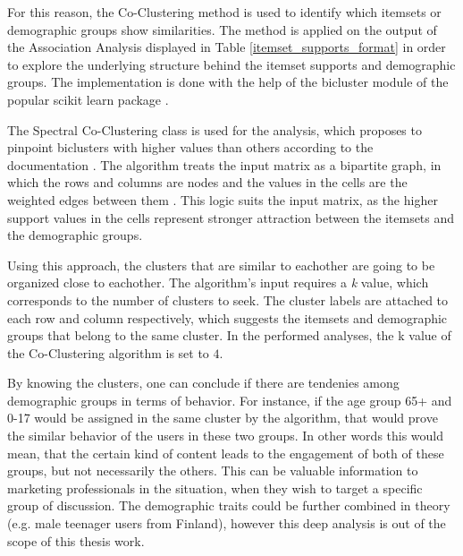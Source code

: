     For this reason, the Co-Clustering method is used to identify which itemsets or demographic groups show similarities. The method is applied on the output of the Association Analysis displayed in Table \ref{itemset_supports_format} in order to explore the underlying structure behind the itemset supports and demographic groups. The implementation is done with the help of the bicluster module \cite{scikit-bicluster} of the popular scikit learn package \cite{scikit-learn}. 
    
    The Spectral Co-Clustering class is used for the analysis, which proposes to pinpoint biclusters with higher values than others according to the documentation \cite{scikit-bicluster}. The algorithm treats the input matrix as a bipartite graph, in which the rows and columns are nodes and the values in the cells are the weighted edges between them \cite{scikit-bicluster}. This logic suits the input matrix, as the higher support values in the cells represent stronger attraction between the itemsets and the demographic groups.

    Using this approach, the clusters that are similar to eachother are going to be organized close to eachother. The algorithm's input requires a \textit{k} value, which corresponds to the number of clusters to seek. The cluster labels are attached to each row and column respectively, which suggests the itemsets and demographic groups that belong to the same cluster. In the performed analyses, the k value of the Co-Clustering algorithm is set to $4$. 

    By knowing the clusters, one can conclude if there are tendenies among demographic groups in terms of behavior. For instance, if the age group 65+ and 0-17 would be assigned in the same cluster by the algorithm, that would prove the similar behavior of the users in these two groups. In other words this would mean, that the certain kind of content leads to the engagement of both of these groups, but not necessarily the others. This can be valuable information to marketing professionals in the situation, when they wish to target a specific group of discussion. The demographic traits could be further combined in theory (e.g. male teenager users from Finland), however this deep analysis is out of the scope of this thesis work. 